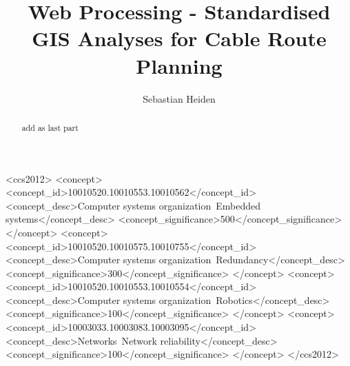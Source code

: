 \documentclass[acmtog]{acmart}
\begin{document}
	\title{Web Processing - Standardised GIS Analyses for Cable Route Planning}
	
	\author{Sebastian Heiden}
	
	
	\renewcommand{\shortauthors}{Heiden}
	
	\begin{abstract}
		add as last part
	\end{abstract}
	
	\begin{CCSXML}
		<ccs2012>
		<concept>
		<concept_id>10010520.10010553.10010562</concept_id>
		<concept_desc>Computer systems organization~Embedded systems</concept_desc>
		<concept_significance>500</concept_significance>
		</concept>
		<concept>
		<concept_id>10010520.10010575.10010755</concept_id>
		<concept_desc>Computer systems organization~Redundancy</concept_desc>
		<concept_significance>300</concept_significance>
		</concept>
		<concept>
		<concept_id>10010520.10010553.10010554</concept_id>
		<concept_desc>Computer systems organization~Robotics</concept_desc>
		<concept_significance>100</concept_significance>
		</concept>
		<concept>
		<concept_id>10003033.10003083.10003095</concept_id>
		<concept_desc>Networks~Network reliability</concept_desc>
		<concept_significance>100</concept_significance>
		</concept>
		</ccs2012>
	\end{CCSXML}
	
	
	
	
	\maketitle
	
\end{document}
